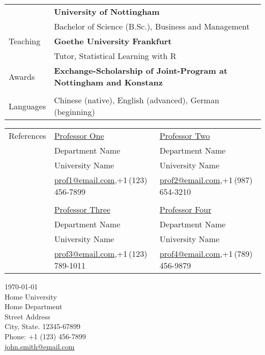 \documentclass[letterpaper,11pt,oneside]{article}
\begin{document}
\begin{tabular}{@{} l l}
     & \textbf{University of Nottingham} \\
     & Bachelor of Science (B.Sc.), Business and Management \\
  \Large{Teaching}   & \textbf{Goethe University Frankfurt} \\
     & Tutor, Statistical Learning with R \\ 
 \Large{Awards}    & \textbf{Exchange-Scholarship of Joint-Program at Nottingham and Konstanz} \\
     & \\
  \Large{Languages}   &Chinese (native), English (advanced), German (beginning) \\
\end{tabular}

\newpage


\noindent \begin{tabular}{@{} l l l}
 \Large{References} & \href{http://www.professorone.com}{Professor One} & \href{http://www.professortwo.com}{Professor Two} \\
 & Department Name &  Department Name  \\
 & University Name &  University Name \\
 & \small{\href{mailto:prof1@email.com}{prof1@email.com},+1\,(123)\,456-7899} & \small{\href{mailto:prof2@email.com}{prof2@email.com},+1\,(987)\,654-3210} \\
&& \\
 & \href{http://www.professorthree.com}{Professor Three} & \href{http://www.professorfour.com}{Professor Four}  \\
 & Department Name &  Department Name \\
 & University Name &  University Name \\
 & \small{\href{mailto:prof3@email.com}{prof3@email.com},+1\,(123)\,789-1011} & \small{\href{mailto:prof4@email.com}{prof4@email.com},+1\,(789)\,456-9879} \\
\end{tabular}



\clearpage
\setlength\parindent{0cm}



\begin{flushright}
 \today                           \\
 \vspace{1em}                              
 Home University            \\
 Home Department                  \\
 Street Address                       \\
 City, State. 12345-67899   \\
 Phone: +1 (123) 456-7899         \\
\href{mailto:john.smith@email.com}{john.smith@email.com}  \\ %
\end{flushright}
\end{document}
